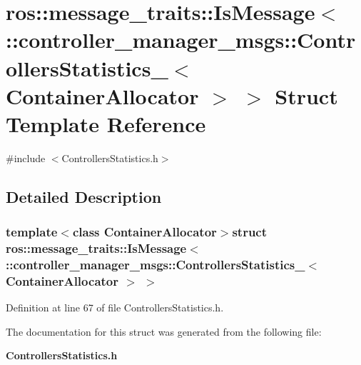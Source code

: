 \section{ros\-:\-:message\-\_\-traits\-:\-:\-Is\-Message$<$ \-:\-:controller\-\_\-manager\-\_\-msgs\-:\-:\-Controllers\-Statistics\-\_\-$<$ \-Container\-Allocator $>$ $>$ \-Struct \-Template \-Reference}
\label{structros_1_1message__traits_1_1IsMessage_3_01_1_1controller__manager__msgs_1_1ControllersStatise4c184048a0ca1251ada039749b3a422}


{\ttfamily \#include $<$\-Controllers\-Statistics.\-h$>$}



\subsection{\-Detailed \-Description}
\subsubsection*{template$<$class Container\-Allocator$>$struct ros\-::message\-\_\-traits\-::\-Is\-Message$<$ \-::controller\-\_\-manager\-\_\-msgs\-::\-Controllers\-Statistics\-\_\-$<$ Container\-Allocator $>$ $>$}



\-Definition at line 67 of file \-Controllers\-Statistics.\-h.



\-The documentation for this struct was generated from the following file\-:\begin{DoxyCompactItemize}
\item 
{\bf \-Controllers\-Statistics.\-h}\end{DoxyCompactItemize}
